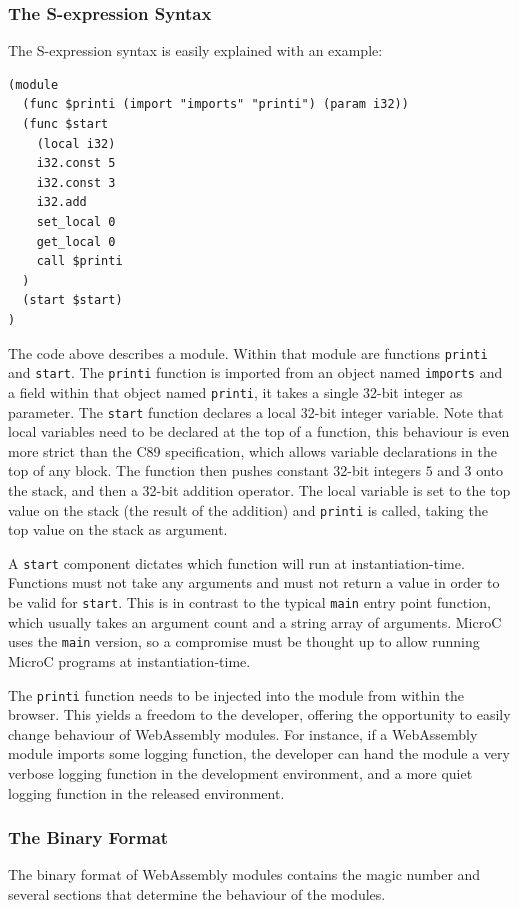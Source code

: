 \documentclass[a4paper]{article}
\begin{document}
\subsubsection{The S-expression Syntax}
\label{sec:problem-analysis:webassembly:s-exp}
The S-expression syntax is easily explained with an example:
\begin{verbatim}
(module
  (func $printi (import "imports" "printi") (param i32))
  (func $start
    (local i32)
    i32.const 5
    i32.const 3
    i32.add
    set_local 0
    get_local 0
    call $printi
  )
  (start $start)
)
\end{verbatim}
The code above describes a module. Within that module are functions \texttt{printi} and \texttt{start}. The \texttt{printi} function is imported from an object named \texttt{imports} and a field within that object named \texttt{printi}, it takes a single 32-bit integer as parameter. The \texttt{start} function declares a local 32-bit integer variable. Note that local variables need to be declared at the top of a function, this behaviour is even more strict than the C89 specification, which allows variable declarations in the top of any block. The function then pushes constant 32-bit integers $5$ and $3$ onto the stack, and then a 32-bit addition operator. The local variable is set to the top value on the stack (the result of the addition) and \texttt{printi} is called, taking the top value on the stack as argument.

A \texttt{start} component dictates which function will run at instantiation-time. Functions must not take any arguments and must not return a value in order to be valid for \texttt{start}. This is in contrast to the typical \texttt{main} entry point function, which usually takes an argument count and a string array of arguments. MicroC uses the \texttt{main} version, so a compromise must be thought up to allow running MicroC programs at instantiation-time.

The \texttt{printi} function needs to be injected into the module from within the browser. This yields a freedom to the developer, offering the opportunity to easily change behaviour of WebAssembly modules. For instance, if a WebAssembly module imports some logging function, the developer can hand the module a very verbose logging function in the development environment, and a more quiet logging function in the released environment.

\subsubsection{The Binary Format}
\label{sec:problem-analysis:webassembly:binary}
The binary format of WebAssembly modules contains the magic number and several sections that determine the behaviour of the modules.
\end{document}
